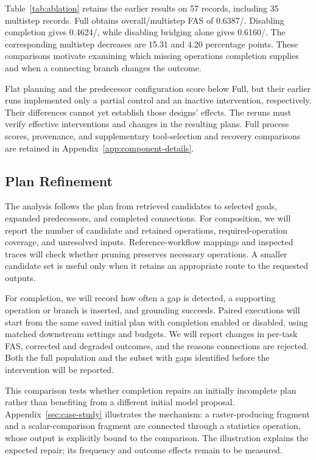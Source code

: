 Table~\ref{tab:ablation} retains the earlier results on 57 records, including 35 multistep records. Full obtains overall/multistep FAS of 0.6387/. Disabling completion gives 0.4624/, while disabling bridging alone gives 0.6160/. The corresponding multistep decreases are 15.31 and 4.20 percentage points. These comparisons motivate examining which missing operations completion supplies and when a connecting branch changes the outcome.


Flat planning and the predecessor configuration score below Full, but their earlier runs implemented only a partial control and an inactive intervention, respectively. Their differences cannot yet establish those designs' effects. The reruns must verify effective interventions and changes in the resulting plans. Full process scores, provenance, and supplementary tool-selection and recovery comparisons are retained in Appendix~\ref{app:component-details}.

\subsection{Plan Refinement}
\label{sec:plan-refinement}
The analysis follows the plan from retrieved candidates to selected goals, expanded predecessors, and completed connections. For composition, we will report the number of candidate and retained operations, required-operation coverage, and unresolved inputs. Reference-workflow mappings and inspected traces will check whether pruning preserves necessary operations. A smaller candidate set is useful only when it retains an appropriate route to the requested outputs.

For completion, we will record how often a gap is detected, a supporting operation or branch is inserted, and grounding succeeds. Paired executions will start from the same saved initial plan with completion enabled or disabled, using matched downstream settings and budgets. We will report changes in per-task FAS, corrected and degraded outcomes, and the reasons connections are rejected. Both the full population and the subset with gaps identified before the intervention will be reported.

This comparison tests whether completion repairs an initially incomplete plan rather than benefiting from a different initial model proposal. Appendix~\ref{sec:case-study} illustrates the mechanism: a raster-producing fragment and a scalar-comparison fragment are connected through a statistics operation, whose output is explicitly bound to the comparison. The illustration explains the expected repair; its frequency and outcome effects remain to be measured.

